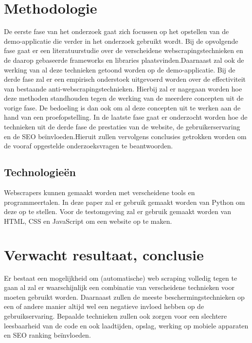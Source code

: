 \section{Methodologie}%
\label{sec:methodologie}
De eerste fase van het onderzoek gaat zich focussen op het opstellen van de demo-applicatie die verder in het onderzoek gebruikt wordt.
\newline
\break
Bij de opvolgende fase gaat er een literatuurstudie over de verscheidene webscrapingstechnieken en de daarop gebaseerde frameworks en libraries plaatsvinden.Daarnaast zal ook de werking van al deze technieken getoond worden op de demo-applicatie.
\newline
\break
Bij de derde fase zal er een empirisch onderstoek uitgevoerd
worden over de effectiviteit van bestaande anti-webscrapingstechnieken. Hierbij zal er nagegaan worden hoe
deze methoden standhouden tegen de werking van de meerdere concepten uit de vorige fase. De bedoeling is dan ook om al deze concepten uit te werken aan de hand van een proefopstelling.
\newline
\break
In de laatste fase gaat er onderzocht worden hoe de technieken uit de derde fase de prestaties van de website, de gebruikerservaring en de SEO beïnvloeden.Hieruit zullen vervolgens conclusies getrokken worden om de vooraf opgestelde onderzoeksvragen te beantwoorden.

\subsection{Technologieën}
Webscrapers kunnen gemaakt worden met verscheidene tools en programmeertalen. In deze paper zal er gebruik gemaakt worden van Python om deze op te stellen. Voor de testomgeving zal er gebruik gemaakt worden van HTML, CSS en JavaScript om een website op te maken. 

\section{Verwacht resultaat, conclusie}%
\label{sec:verwachte_resultaten}
Er bestaat een mogelijkheid om (automatische) web scraping volledig tegen te gaan al zal er waarschijnlijk een combinatie van verscheidene technieken voor moeten gebruikt worden. 
Daarnaast zullen de meeste beschermingstechnieken op een of andere manier altijd wel een negatieve invloed hebben op de gebruikservaring. Bepaalde technieken zullen ook zorgen voor een slechtere leesbaarheid van de code en ook laadtijden, opslag, werking op mobiele apparaten en SEO ranking beïnvloeden.
\newline 